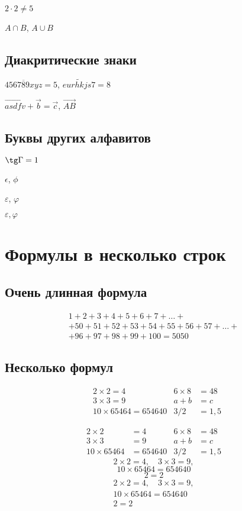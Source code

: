 \documentclass[a4paper,14pt]{extarticle}
\begin{document}
$2\cdot 2 \ne 5$

$A \cap B$, $A \cup B$

\subsection{Диакритические знаки}

$\overline{456789xyz}=5$, $\widetilde{eurhkjs7} = 8$

$\vec{asdfv} + \vec b = \vec c$, $\overrightarrow{AB}$


\subsection{Буквы других алфавитов}

$\tg \Gamma = 1$

$\epsilon$, $\phi$

$\varepsilon$, $\varphi$

\renewcommand{\epsilon}{\varepsilon}
\renewcommand{\phi}{\varphi}
$\epsilon, \phi$

\section{Формулы в несколько строк}

\subsection{Очень длинная формула}

\begin{multline}
	1+ 2+3+4+5+6+7+\dots + \\ 
	+ 50+51+52+53+54+55+56+57 + \dots + \\ 
	+ 96+97+98+99+100=5050 \tag{S} \label{eq:sum}
\end{multline}


\subsection{Несколько формул}
\begin{align}
	&2\times 2 = 4 & 6\times 8 &= 48 \\
	&3\times 3 = 9 & a+b &= c\\
	&10 \times 65464 = 654640 & 3/2&=1,5
\end{align}

\begin{equation}
	\begin{aligned}
		2\times 2 &= 4 & 6\times 8 &= 48 \\
		3\times 3 &= 9 & a+b &= c\\
		10 \times 65464 &= 654640 & 3/2&=1,5
	\end{aligned}
\end{equation}
\newpage
\[2\times 2 = 4, \hspace{1em} 3\times 3 = 9,\]
\[10 \times 65464 = 654640\]
\[2=2\]
\begin{gather}
	2\times 2 = 4, \hspace{1em} 3\times 3 = 9,\\[0.2cm]
	10 \times 65464 = 654640\\
	2=2
\end{gather}
\end{document}
